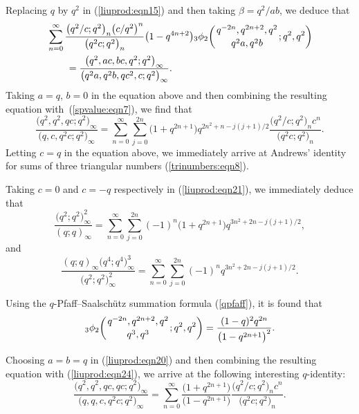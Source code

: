 \documentclass[10pt,a4paper]{amsart}
\numberwithin{equation}{section}
\begin{document}
Replacing $q$ by $q^2$ in (\ref{liuprod:eqn15}) and then taking $\beta=q^2/{ab}$, we deduce that
\begin{align}
	&\sum_{n=0}^\infty \frac{\bigl(q^2/c; q^2\bigr)_n \bigl(c/q^2\bigr)^n}{\bigl(q^2c; q^2\bigr)_n} \bigl(1-q^{4n+2}\bigr)
	{_3\phi_2} \biggl({{q^{-2n}, q^{2n+2}, q^2}\atop{q^2a, q^2b}}; q^2, q^2\biggr)\nonumber\\
	&\qquad{}=\frac{\bigl(q^2, ac, bc, q^2; q^2\bigr)_\infty}{\bigl(q^2a, q^2b, qc^2, c; q^2\bigr)_\infty}.\label{liuprod:eqn20}
\end{align}
Taking $a=q$, $b=0$ in the equation above and then combining the resulting equation with~(\ref{spvalue:eqn7}), we find that
\begin{equation}\label{liuprod:eqn21}
\frac{\bigl(q^2, q^2, qc; q^2\bigr)_\infty}{\bigl(q, c, q^2c; q^2\bigr)_\infty}=\sum_{n=0}^\infty \sum_{j=0}^{2n} \bigl(1+q^{2n+1}\bigr) q^{2n^2+n-j(j+1)/2}
\frac{\bigl(q^2/c; q^2\bigr)_n c^n}{\bigl(q^2c; q^2\bigr)_n}.
\end{equation}
Letting $c=q$ in the equation above, we immediately arrive at
Andrews' identity for sums of three triangular numbers (\ref{trinumbers:eqn8}).

Taking $c=0$ and $c=-q$ respectively in (\ref{liuprod:eqn21}), we immediately deduce that
\begin{equation*}%
\frac{\bigl(q^2; q^2\bigr)_\infty^2}{(q; q)_\infty}
=\sum_{n=0}^\infty \sum_{j=0}^{2n} (-1)^n \bigl(1+q^{2n+1}\bigr) q^{3n^2+2n-j(j+1)/2},
\end{equation*}
and
\begin{equation*}%
\frac{(q; q)_\infty \bigl(q^4; q^4\bigr)^3_\infty}{\bigl(q^2; q^2\bigr)^2_\infty}
=\sum_{n=0}^\infty \sum_{j=0}^{2n} (-1)^n q^{3n^2+2n-j(j+1)/2}.	
\end{equation*}

Using the $q$-Pfaff--Saalsch\"utz summation formula (\ref{qpfaff}), it is found that
\begin{equation}\label{liuprod:eqn24}
{_3\phi_2} \biggl({{q^{-2n}, q^{2n+2}, q^2}\atop{q^3, q^3}}; q^2, q^2\biggr)
=\frac{(1-q)^2 q^{2n}}{\bigl(1-q^{2n+1}\bigr)^2}.
\end{equation}

Choosing $a=b=q$ in (\ref{liuprod:eqn20}) and then combining the resulting equation with (\ref{liuprod:eqn24}), we arrive at the following interesting $q$-identity:
\begin{equation}\label{liuprod:eqn25}
\frac{\bigl(q^2, q^2, qc, qc; q^2\bigr)_\infty}{\bigl(q, q, c, q^2c; q^2\bigr)_\infty}
=\sum_{n=0}^\infty \frac{\bigl(1+q^{2n+1}\bigr)}{\bigl(1-q^{2n+1}\bigr)} \frac{\bigl(q^2/c; q^2\bigr)_n c^n}{\bigl(q^2c; q^2\bigr)_n}.
\end{equation}
\end{document}
